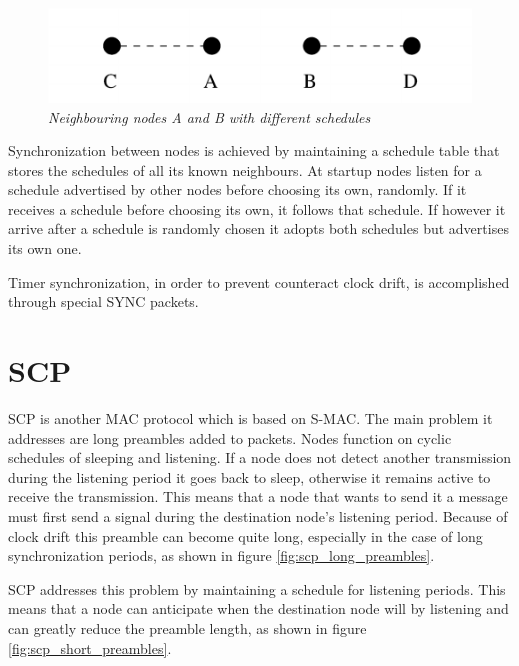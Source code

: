\begin{figure}[ht]
	\begin{center}
		\includegraphics{img/s-mac_schedules.pdf}
	\end{center}
	\caption{\small \itshape{Neighbouring nodes A and B with different
	schedules\protect\footnotemark}}
	\label{fig:s-mac_schedules}
\end{figure}

Synchronization between nodes is achieved by maintaining a schedule table that
stores the schedules of all its known neighbours. At startup nodes listen for a
schedule advertised by other nodes before choosing its own, randomly. If it
receives a schedule before choosing its own, it follows that schedule. If
however it arrive after a schedule is randomly chosen it adopts both schedules
but advertises its own one. 

Timer synchronization, in order to prevent counteract clock drift, is
accomplished through special SYNC packets.

\section{SCP}

SCP\cite{ye2006ultra} is another MAC protocol which is based on S-MAC. The main
problem it addresses are long preambles added to packets. Nodes function on
cyclic schedules of sleeping and listening. If a node does not detect another
transmission during the listening period it goes back to sleep, otherwise it
remains active to receive the transmission. This means that a node that wants
to send it a message must first send a signal during the destination node's
listening period. Because of clock drift this preamble can become quite long,
especially in the case of long synchronization periods, as shown in figure
\ref{fig:scp_long_preambles}.

SCP addresses this problem by maintaining a schedule for listening periods.
This means that a node can anticipate when the destination node will by
listening and can greatly reduce the preamble length, as shown in figure
\ref{fig:scp_short_preambles}.

